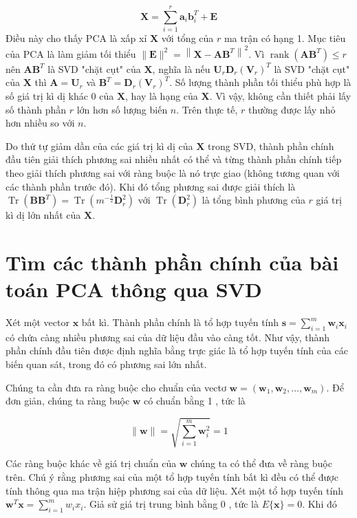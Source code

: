 \documentclass[12pt,a4paper,oneside]{report}
\numberwithin{equation}{section}
\begin{document}
$$
\mathbf{X}=\sum_{i=1}^{r} \mathbf{a}_{i} \mathbf{b}_{i}^{T}+\mathbf{E}
$$
Điều này cho thấy $\mathrm{PCA}$ là xấp xỉ $\mathbf{X}$ với tổng của $r$ ma trận có hạng 1.
Mục tiêu của PCA là làm giảm tối thiểu $\|\mathbf{E}\|^{2}=\left\|\mathbf{X}-\mathbf{A} \mathbf{B}^{T}\right\|^{2}$. Vì $\operatorname{rank}\left(\mathbf{A} \mathbf{B}^{T}\right) \leq r$ nên $\mathbf{A} \mathbf{B}^{T}$ là SVD "chặt cụt" của $\mathbf{X}$, nghĩa là nếu $\mathbf{U}_{r} \mathbf{D}_{r}\left(\mathbf{V}_{r}\right)^{T}$ là SVD "chặt cụt" của $\mathbf{X}$ thì $\mathbf{A}= \mathbf{U}_{r}$ và $\mathbf{B}^{T}= \mathbf{D}_{r}\left(\mathbf{V}_{r}\right)^{T}$. Số lượng thành phần tối thiểu phù hợp là số giá trị kì dị khác 0 của $\mathbf{X}$, hay là hạng của $\mathbf{X}$. Vì vậy, không cần thiết phải lấy số thành phần $r$ lớn hơn số lượng biến $n$. Trên thực tế, $r$ thường được lấy nhỏ hơn nhiều so với $n$.

Do thứ tự giảm dần của các giá trị kì dị của $\mathbf{X}$ trong SVD, thành phần chính đầu tiên giải thích phương sai nhiều nhất có thể và từng thành phần chính tiếp theo giải thích phương sai với ràng buộc là nó trực giao (không tương quan với các thành phần trước đó). Khi đó tổng phương sai được giải thích là $\operatorname{Tr}\left(\mathbf{B} \mathbf{B}^{T}\right)=\operatorname{Tr}\left(m^{-\frac{1}{2}} \mathbf{D}_{r}^{2}\right)$ với $\operatorname{Tr}\left(\mathbf{D}_{r}^{2}\right)$ là tổng bình phương của $r$ giá trị kì dị lớn nhất của $\mathbf{X}$.

\section{Tìm các thành phần chính của bài toán PCA thông qua SVD}

Xét một vector $\mathbf{x}$ bất kì. Thành phần chính là tổ hợp tuyến tính $\mathbf{s}=\sum_{i=1}^{m} \mathbf{w}_{i} \mathbf{x}_{i}$ có chứa càng nhiều phương sai của dữ liệu đầu vào càng tốt. Như vậy, thành phần chính đầu tiên được định nghĩa bằng trực giác là tổ hợp tuyến tính của các biến quan sát, trong đó có phương sai lớn nhất.

Chúng ta cần đưa ra ràng buộc cho chuẩn của vectơ $\mathbf{w}=\left(\mathbf{w}_{1}, \mathbf{w}_{2}, \ldots, \mathbf{w}_{m}\right)$. Để đơn giản, chúng ta ràng buộc $\mathbf{w}$ có chuẩn bằng 1 , tức là

$$
\|\mathbf{w}\|=\sqrt{\sum_{i=1}^{m} \mathbf{w}_{i}^{2}}=1
$$

Các ràng buộc khác về giá trị chuẩn của $\mathbf{w}$ chúng ta có thể đưa về ràng buộc trên.
Chú ý rằng phương sai của một tổ hợp tuyến tính bất kì đều có thể được tính thông qua ma trận hiệp phương sai của dữ liệu. Xét một tổ hợp tuyến tính $\mathbf{w}^{T} \mathbf{x}=\sum_{i=1}^{m} w_{i} x_{i}$. Giả sử giá trị trung bình bằng 0 , tức là $E\{\mathbf{x}\}=0$. Khi đó
\end{document}
